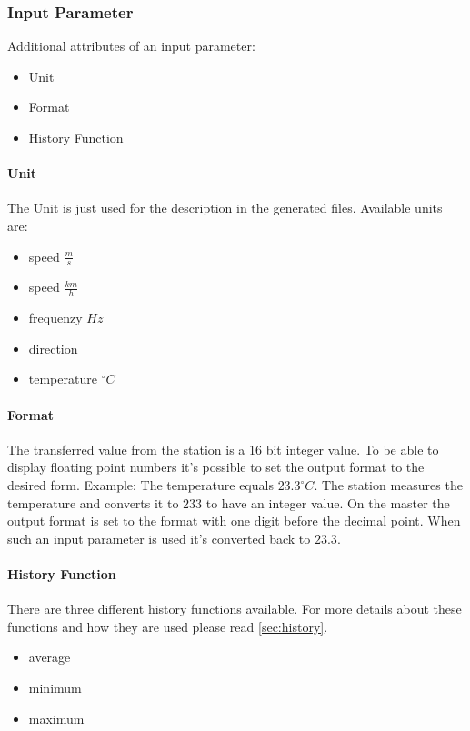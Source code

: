 \subsubsection{Input Parameter} %
\label{ssub:input_parameter}
Additional attributes of an input parameter:
\begin{itemize}
	\item Unit
	\item Format
	\item History Function
\end{itemize}

\paragraph{Unit} %
\label{par:unit}
The Unit is just used for the description in the generated files. Available units are:
\begin{itemize}
	\item speed $\frac{m}{s}$
	\item speed $\frac{km}{h}$
	\item frequenzy $Hz$
	\item direction
	\item temperature $^\circ C$
\end{itemize}


\paragraph{Format} %
\label{par:format}
The transferred value from the station is a 16 bit integer value. To be able to display floating point numbers it's possible to set the output format to the desired form. Example: The temperature equals $23.3 ^\circ C$. The station measures the temperature and converts it to $233$ to have an integer value. On the master the output format is set to the format with one digit before the decimal point. When such an input parameter is used it's converted back to $23.3$.

\paragraph{History Function} %
\label{par:histfunc}
There are three different history functions available. For more details about these functions and how they are used please read \ref{sec:history}.
\label{par:history_function}
\begin{itemize}
    \item average
    \item minimum
    \item maximum
\end{itemize}

